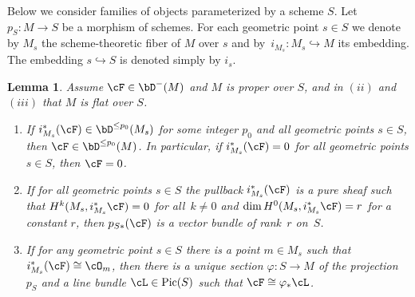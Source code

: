 \documentclass[11pt]{amsart}
\DeclareMathOperator{\Pic}{\mathrm{Pic}}
\theoremstyle{plain}
\newtheorem{lemma}[theorem]{Lemma}
\theoremstyle{definition}
\theoremstyle{remark}
\begin{document}
Below we consider families of objects parameterized by a scheme $S$.
Let $p_S \colon M \to S$ be a morphism of schemes.
For each geometric point $s \in S$ we denote by $M_s$ the scheme-theoretic fiber of $M$ over $s$ 
and by~$i_{M_s} \colon M_s \hookrightarrow M$ its embedding.
The embedding $s \hookrightarrow S$ is denoted simply by $i_s$.


\begin{lemma}
\label{lemma:fiberwise}
Assume $\cF \in \bD^-(M)$ and $M$ is proper over $S$, and in $(ii)$ and $(iii)$ that $M$ is flat over $S$.
\begin{enumerate}
\item[$(i)$] 
If $i_{M_s}^*(\cF) \in \bD^{\le p_0}(M_s)$ for some integer $p_0$ and all geometric points $s \in S$, then $\cF \in \bD^{\le p_0}(M)$.
In particular, if $i_{M_s}^*(\cF) = 0$ for all geometric points $s \in S$, then $\cF = 0$.
\item[$(ii)$] 
If for all geometric points $s \in S$ the pullback $i_{M_s}^*(\cF)$ is a pure sheaf 
such that $H^k(M_s, i_{M_s}^*\cF) = 0$ for all~$k \ne 0$ and $\dim H^0(M_s,i_{M_s}^*\cF) = r$ for a constant $r$,
then $p_{S*}(\cF)$ is a vector bundle of rank~$r$ on~$S$.
\item[$(iii)$] 
If for any geometric point $s \in S$ there is a point $m \in M_s$ such that $i_{M_s}^*(\cF) \cong \cO_m$, then 
there is a unique section $\varphi \colon S \to M$ of the projection $p_S$ and a line bundle $\cL \in \Pic(S)$ such that $\cF \cong \varphi_*\cL$.
\end{enumerate}
\end{lemma}
\end{document}
